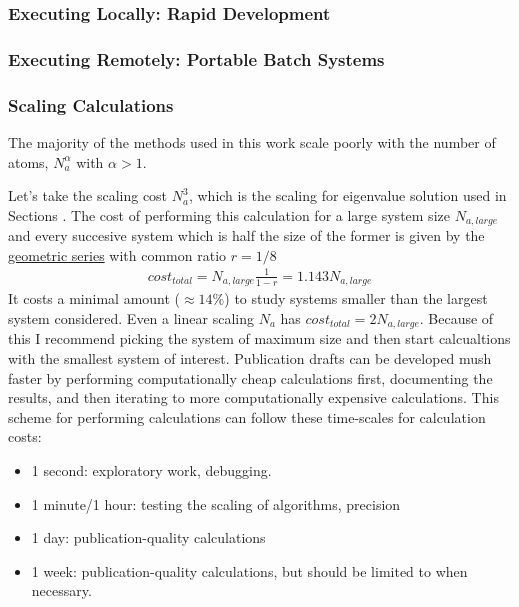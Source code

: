 \subsubsection{\label{A:coding_lang:Execute:Local}
Executing Locally: Rapid Development}

\subsubsection{\label{A:coding_lang:Execute:Remote}
Executing Remotely: Portable Batch Systems}

\subsubsection{\label{A:coding_lang:Execute:Scaling}
Scaling Calculations}

The majority of the methods 
used in this work scale poorly with the number of atoms, $N_a^\alpha$ 
with $\alpha >1$. 

Let's take the scaling cost $N_a^3$, which is the scaling for 
eigenvalue solution used in Sections . 
The cost of performing this calculation for a large system size 
$N_{a,large}$  
and every succesive system which is half the size of the former 
is given by the 
\href{http://en.wikipedia.org/wiki/Geometric_series}{geometric series} 
with common ratio $r=1/8$
\begin{equation}\label{EQ:cost_total}
\begin{split}
cost_{total} = N_{a,large}\frac{1}{1-r} = 1.143N_{a,large} 
\end{split}
\end{equation}
It costs a minimal amount ($ \approx 14\%$) to study systems smaller 
than the largest system considered. Even a linear scaling 
$N_a$ has $cost_{total} = 2N_{a,large}$. 
Because of this I recommend 
picking the system of maximum size and then start calcualtions with 
the smallest system of interest. 
Publication drafts can be 
developed mush faster by performing computationally cheap calculations 
first, documenting the results, and then iterating to more 
computationally expensive calculations. 
This scheme for performing calculations can follow these time-scales 
for calculation costs:
\begin{itemize}

\item 1 second: exploratory work, debugging.  
\item 1 minute/1 hour: testing the scaling of algorithms, precision  
\item 1 day: publication-quality calculations
\item 1 week: publication-quality calculations, but should be limited 
to when necessary. 
\end{itemize}

